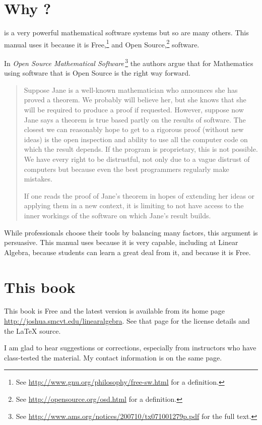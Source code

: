 \section{Why \Sage?}
\Sage{} is a very powerful mathematical software systems but so are
many others.
This manual uses it because it is 
Free,\footnote{See \protect\url{http://www.gnu.org/philosophy/free-sw.html} 
for a definition.} 
and Open Source,\footnote{See \protect\url{http://opensource.org/osd.html} 
for a definition.} software.

In 
\textit{Open Source Mathematical Software\,}\citep{JoynerStein07}\footnote{See 
\protect\url{http://www.ams.org/notices/200710/tx071001279p.pdf} for the 
full text.}
the authors argue that for Mathematics using software that is Open Source
is the right way forward.

\begin{quotation}\small
Suppose Jane is a well-known mathematician who announces
she has proved a theorem. We probably will believe
her, but she knows that she will be required to produce
a proof if requested. However, suppose now Jane says a
theorem is true based partly on the results of software. The
closest we can reasonably hope to get to a rigorous proof
(without new ideas) is the open inspection and ability to use
all the computer code on which the result depends. If the
program is proprietary, this is not possible. We have every
right to be distrustful, not only due to a vague distrust of
computers but because even the best programmers regularly
make mistakes.

If one reads the proof of Jane’s theorem in hopes of
extending her ideas or applying them in a new context, it
is limiting to not have access to the inner workings of the
software on which Jane’s result builds.
\end{quotation}  
While professionals choose their tools by balancing many factors,
this argument is persuasive.
This manual uses \Sage{} because it is very capable, 
including at Linear Algebra, because students can 
learn a great deal from it,
and because it is Free.


\section{This book}
This book is Free and
the latest version is available from its home page 
\url{http://joshua.smcvt.edu/linearalgebra}.
See that page for the license details and the \LaTeX{} source.

I am glad to hear suggestions or corrections, especially from instructors
who have class-tested the material.
My contact information is on the same page. 



